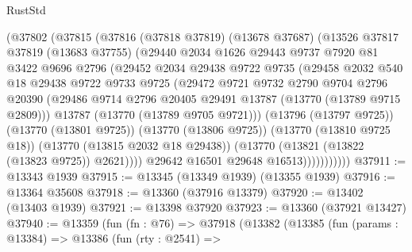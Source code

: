 \begin{lexlean}{RustStd}
\begin{coremodule}
                (@37802
                  (@37815
                    (@37816
                      (@37818 @37819)
                      (@13678 @37687)
                      (@13526
                        @37817
                        @37819
                        (@13683 @37755)
                        (@29440
                          @2034
                          @1626
                          @29443
                          @9737
                          @7920
                          @81
                          @3422
                          @9696
                          @2796
                          (@29452
                            @2034
                            @29438
                            @9722
                            @9735
                            (@29458
                              @2032
                              @540
                              @18
                              @29438
                              @9722
                              @9733
                              @9725
                              (@29472
                                @9721
                                @9732
                                @2790
                                @9704
                                @2796
                                @20390
                                (@29486
                                  @9714
                                  @2796
                                  @20405
                                  @29491
                                  @13787
                                  (@13770 (@13789 @9715 @2809)))
                                @13787
                                (@13770 (@13789 @9705 @9721)))
                              (@13796 (@13797 @9725))
                              (@13770 (@13801 @9725))
                              (@13770 (@13806 @9725))
                              (@13770 (@13810 @9725 @18))
                              (@13770 (@13815 @2032 @18 @29438))
                              (@13770 (@13821 (@13822 (@13823 @9725)) @2621))))
                          @29642
                          @16501
                          @29648
                          @16513)))))))))))
@37911 := @13343 @1939
@37915 := @13345 (@13349 @1939) (@13355 @1939)
@37916 := @13364 @35608
@37918 := @13360 (@37916 @13379)
@37920 := @13402 (@13403 @1939)
@37921 := @13398 @37920
@37923 := @13360 (@37921 @13427)
@37940 := @13359
    (fun (fn : @76) =>
    @37918
      (@13382
        (@13385
          (fun (params : @13384) =>
          @13386
            (fun (rty : @2541) =>

\end{coremodule}
\end{lexlean}

